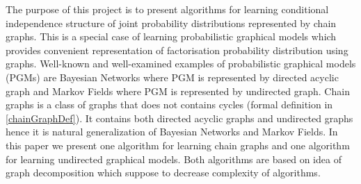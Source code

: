 

The purpose of this project is to present algorithms for learning conditional independence structure of joint probability distributions represented by chain graphs. This is a special case of learning probabilistic graphical models which provides convenient representation of factorisation probability distribution using graphs.
Well-known and well-examined examples of probabilistic graphical models (PGMs) are Bayesian Networks where PGM is represented by directed acyclic graph and Markov Fields where PGM is represented by undirected graph. Chain graphs is a class of graphs that does not contains cycles (formal definition in \ref{chainGraphDef}). It contains both directed acyclic graphs and undirected graphs hence it is natural generalization of Bayesian Networks and Markov Fields.
In this paper we present one algorithm for learning chain graphs and one algorithm for learning undirected graphical models. Both algorithms are based on idea of graph decomposition which suppose to decrease complexity of algorithms.